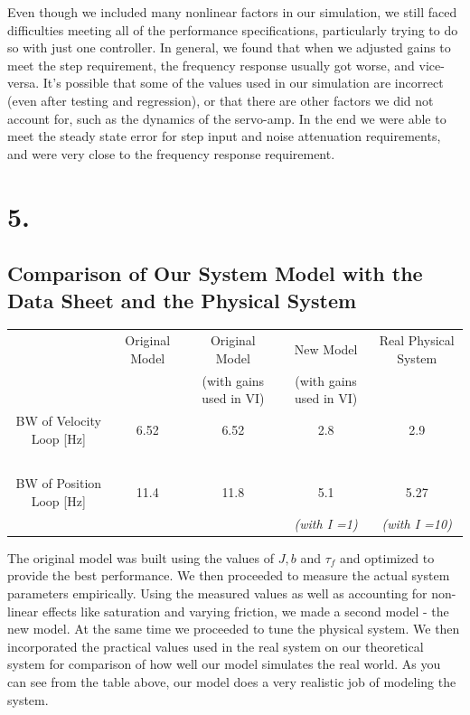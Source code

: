 \documentclass{article}
\theoremstyle{plain}
\theoremstyle{definition}
\theoremstyle{remark}
\begin{document}
Even though we included many nonlinear factors in our simulation, we still faced difficulties meeting all of the performance specifications, particularly trying to do so with just one controller. In general, we found that when we adjusted gains to meet the step requirement, the frequency response usually got worse, and vice-versa. It's possible that some of the values used in our simulation are incorrect (even after testing and regression), or that there are other factors we did not account for, such as the dynamics of the servo-amp. In the end we were able to meet the steady state error for step input and noise attenuation requirements, and were very close to the frequency response requirement.\\


\clearpage 

\section*{5.}
\subsection*{ Comparison of Our System Model with the Data Sheet and the Physical System}
\begin{table}[htb]
    \begin{tabular}{|c|c|c|c|c|}
        \hline
        ~                        & Original Model & Original Model   & New Model & Real Physical System \\ 
	~	& ~	& (with gains used in VI)& (with gains used in VI)& ~\\ \hline
        BW of Velocity Loop [Hz] & 6.52           & 6.52                                    & 2.8                               & 2.9                  \\ 
	~&	~&	~&	~&	~\\
        BW of Position Loop [Hz] & 11.4           & 11.8                                    & 5.1                    & 5.27     \\
	~ &~	&~	&\emph{(with I =1)} & \emph{(with I =10)}\\
        \hline
    \end{tabular}
\end{table}

The original model was built using the values of $J, b$ and $\tau_f$ and optimized to provide the best performance. We then proceeded to measure the actual system parameters empirically. Using the measured values as well as accounting for non-linear effects like saturation and varying friction, we made a second model - the new model. At the same time we proceeded to tune the physical system. We then incorporated the practical values used in the real system on our theoretical system for comparison of how well our model simulates the real world. As you can see from the table above, our model does a very realistic job of modeling the system.
\end{document}
